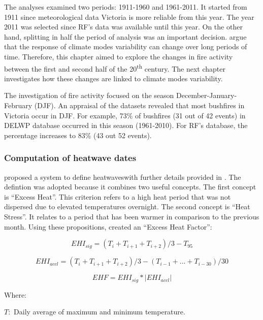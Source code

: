 The analyses examined two periods: 1911-1960 and 1961-2011. It started
from 1911 since meteorological data Victoria is more reliable from
this year. The year 2011 was selected since RF's data was available
until this year. On the other hand, splitting in half the period of
analysis was an important decision. \citet{Wang2013} argue that the
response of climate modes variability can change over long periods
of time. Therefore, this chapter aimed to explore the changes in fire
activity between the first and second half of the 20\textsuperscript{th}
century. The next chapter investigates how these changes are linked
to climate modes variability.

The investigation of fire activity focused on the season December-January-February
(DJF). An appraisal of the datasets revealed that most bushfires in
Victoria occur in DJF. For example, 73\% of bushfires (31 out of 42
events) in DELWP database occurred in this season (1961-2010). For
RF's database, the percentage increases to 83\% (43 out 52 events).


\subsubsection{Computation of heatwave dates}

\citet{Nairn2009}proposed a system to define heatwaves\textemdash with
further details provided in \citet{Nairn2013}\textemdash . The defintion
was adopted because it combines two useful concepts. The first concept
is ``Excess Heat''. This criterion refers to a high heat period
that was not dispersed due to elevated temperatures overnight. The
second concept is ``Heat Stress''. It relates to a period that has
been warmer in comparison to the previous month. Using these propositions,
\citet{Nairn2009} created an ``Excess Heat Factor'':

\begin{equation}
EHI_{sig}=(T_{i}+T_{i+1}+T_{i+2})/3-T_{95}
\end{equation}


\begin{equation}
EHI_{accl}=(T_{i}+T_{i+1}+T_{i+2})/3-(T_{i-1}+...+T_{i-30})/30
\end{equation}


\begin{equation}
EHF=EHI_{sig}*\left|EHI_{accl}\right|
\end{equation}


Where:

$T:$ Daily average of maximum and minimum temperature.


